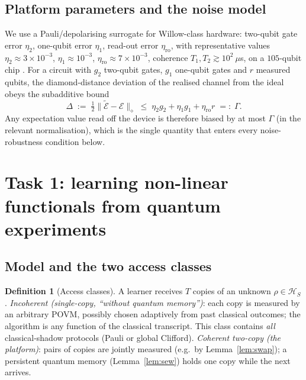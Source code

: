 \documentclass[11pt]{article}
\theoremstyle{plain}
\theoremstyle{definition}
\newtheorem{definition}[theorem]{Definition}
\theoremstyle{remark}
\newcommand{\Hs}{\mathcal{H}}
\newcommand{\norm}[1]{\lVert #1 \rVert}
\begin{document}
\subsection{Platform parameters and the noise model}\label{sec:noise}
We use a Pauli/depolarising surrogate for Willow-class hardware: two-qubit gate error $\eta_2$, one-qubit error $\eta_1$, read-out error $\eta_{\mathrm{ro}}$, with representative values $\eta_2\approx 3\times10^{-3}$, $\eta_1\approx 10^{-3}$, $\eta_{\mathrm{ro}}\approx 7\times10^{-3}$, coherence $T_1,T_2\gtrsim 10^2~\mu$s, on a $105$-qubit chip \cite{Willow}. For a circuit with $g_2$ two-qubit gates, $g_1$ one-qubit gates and $r$ measured qubits, the diamond-distance deviation of the realised channel from the ideal obeys the subadditive bound
\begin{equation}
\Delta\;:=\;\tfrac12\norm{\widetilde{\mathcal E}-\mathcal E}_{\diamond}\;\le\;\eta_2 g_2+\eta_1 g_1+\eta_{\mathrm{ro}} r\;=:\;\Gamma .
\label{eq:errbudget}
\end{equation}
Any expectation value read off the device is therefore biased by at most $\Gamma$ (in the relevant normalisation), which is the single quantity that enters every noise-robustness condition below.

\section{Task 1: learning non-linear functionals from quantum experiments}\label{sec:task1}

\subsection{Model and the two access classes}
\begin{definition}[Access classes]\label{def:access}
A learner receives $T$ copies of an unknown $\rho\in\Hs_S$.
\emph{Incoherent (single-copy, ``without quantum memory'')}: each copy is measured by an arbitrary POVM, possibly chosen adaptively from past classical outcomes; the algorithm is any function of the classical transcript. This class contains \emph{all} classical-shadow protocols (Pauli or global Clifford).
\emph{Coherent two-copy (the platform)}: pairs of copies are jointly measured (e.g.\ by Lemma~\ref{lem:swap}); a persistent quantum memory (Lemma~\ref{lem:sew}) holds one copy while the next arrives.
\end{definition}
\end{document}
